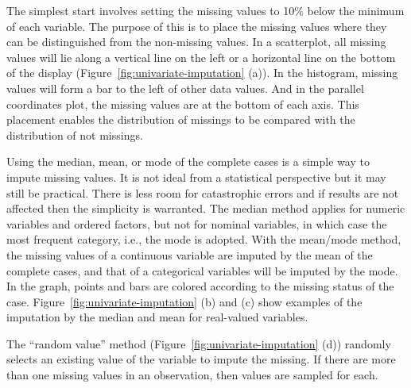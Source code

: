 \documentclass[article]{jss}
\begin{document}
The simplest start involves setting the missing values to 10\% below the minimum of each variable. The purpose of this is to place the missing values where they can be distinguished from the non-missing values. In a scatterplot, all missing values will lie along a vertical line on the left or a horizontal line on the bottom of the display (Figure~\ref{fig:univariate-imputation} (a)). In the histogram, missing values will form a bar to the left of other data values. And in the parallel coordinates plot, the missing values are at the bottom of each axis. This placement enables the distribution of missings to be compared with the distribution of not missings.

Using the median, mean, or mode of the complete cases is a simple way to impute missing values. It is not ideal from a statistical perspective but it may still be practical. There is less room for catastrophic errors and if results are not affected then the simplicity is warranted. The median method applies for numeric variables and ordered factors, but not for nominal variables, in which case the most frequent category, i.e., the mode is adopted. With the mean/mode method, the missing values of a continuous variable are imputed by the mean of the complete cases, and that of a categorical variables will be imputed by the mode. In the graph, points and bars are colored according to the missing status of the case. Figure~\ref{fig:univariate-imputation} (b) and (c) show examples of the imputation by the median and mean for real-valued variables.

The ``random value'' method (Figure~\ref{fig:univariate-imputation} (d)) randomly selects an existing value of the variable to impute the missing. If there are more than one missing values in an observation, then values are sampled for each.
\end{document}
